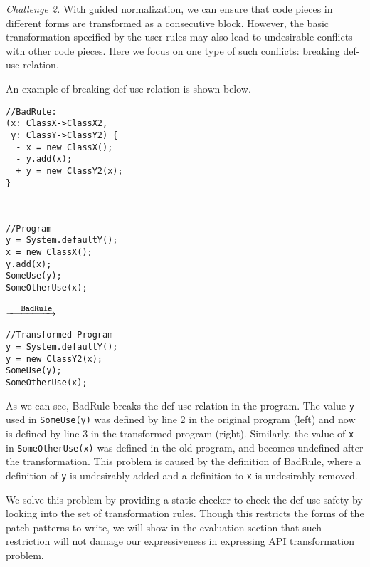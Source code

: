 \documentclass[a4paper, USenglish]{lipics-v2016}
\newenvironment{smpage}[1]
{\begin{lrbox}{\fmbox}\begin{minipage}{#1}}
{\end{minipage}\end{lrbox}\usebox{\fmbox}}
\newcommand{\code}[1]{\texttt{\footnotesize #1}}
\theoremstyle{plain}
\begin{document}
\textit{Challenge 2.} With guided normalization, we can ensure that code pieces in different
forms are transformed as a consecutive block. However, the basic
transformation specified by the user rules may also lead to undesirable conflicts
with other code pieces. Here we focus
on one type of such conflicts: breaking def-use relation.

An example of breaking def-use relation is shown below.
\begin{center}
\begin{smpage}{0.3\columnwidth}
\begin{lstlisting}[style=patl,frame=none, basicstyle=\scriptsize\ttfamily]
//BadRule:
(x: ClassX->ClassX2, 
 y: ClassY->ClassY2) {
  - x = new ClassX();
  - y.add(x);
  + y = new ClassY2(x);  
}
\end{lstlisting}
\end{smpage}
~
\begin{smpage}{0.25\columnwidth}
\begin{lstlisting}[style=patl,frame=none, basicstyle=\scriptsize\ttfamily]
//Program
y = System.defaultY();
x = new ClassX();
y.add(x);
SomeUse(y);
SomeOtherUse(x);
\end{lstlisting}
\end{smpage}
$\xrightarrow{\code{BadRule}}$~~~
\begin{smpage}{0.25\columnwidth}
\begin{lstlisting}[style=patl,frame=none, basicstyle=\scriptsize\ttfamily]
//Transformed Program
y = System.defaultY();
y = new ClassY2(x);
SomeUse(y);
SomeOtherUse(x);
\end{lstlisting}
\end{smpage}
\end{center}

As we can see, {BadRule} breaks the def-use relation in the program. The
value \code{y} used in \code{SomeUse(y)} was defined by line 2 in the
original program (left) and now is defined by line 3 in the transformed program (right). 
Similarly, the value of \code{x} in \code{SomeOtherUse(x)} was defined in the old program, and becomes
undefined after the transformation. This problem is caused by the
definition of BadRule, where a definition of \code{y} is undesirably
added and a definition to \code{x} is undesirably removed.

We solve this problem by providing a static checker to 
check the def-use safety by looking into the set of transformation
rules. Though this restricts the forms of the patch patterns to write, we will show in the evaluation section that such restriction will not damage our expressiveness in expressing API transformation problem.
\end{document}
